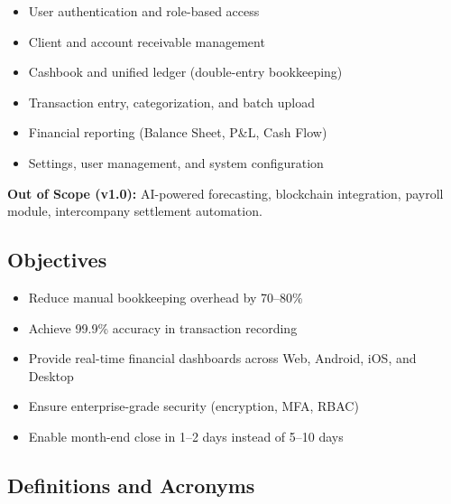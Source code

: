 \documentclass[journal, a4paper, onecolumn, 12pt]{IEEEtran}
\begin{document}
\begin{itemize}[leftmargin=*]
\item User authentication and role-based access
\item Client and account receivable management
\item Cashbook and unified ledger (double-entry bookkeeping)
\item Transaction entry, categorization, and batch upload
\item Financial reporting (Balance Sheet, P\&L, Cash Flow)
\item Settings, user management, and system configuration
\end{itemize}

\textbf{Out of Scope (v1.0):} AI-powered forecasting, blockchain integration, payroll module, intercompany settlement automation.

\subsection{Objectives}
\begin{itemize}[leftmargin=*]
\item Reduce manual bookkeeping overhead by 70–80\%
\item Achieve 99.9\% accuracy in transaction recording
\item Provide real-time financial dashboards across Web, Android, iOS, and Desktop
\item Ensure enterprise-grade security (encryption, MFA, RBAC)
\item Enable month-end close in 1–2 days instead of 5–10 days
\end{itemize}

\subsection{Definitions and Acronyms}
\end{document}
